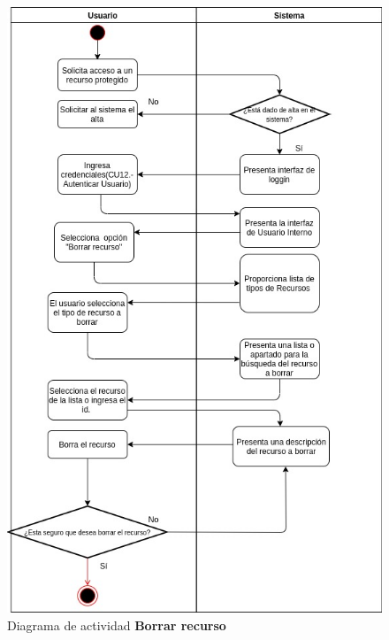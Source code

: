 \pagebreak
\begin{figure}[h]
\centering
\caption{Diagrama de actividad \textbf{Borrar recurso}}\label{fig:priorReq}
\includegraphics[width=1\textwidth, height=1.5\textwidth]{images/diag_act_borrar_recurso}
\end{figure}

